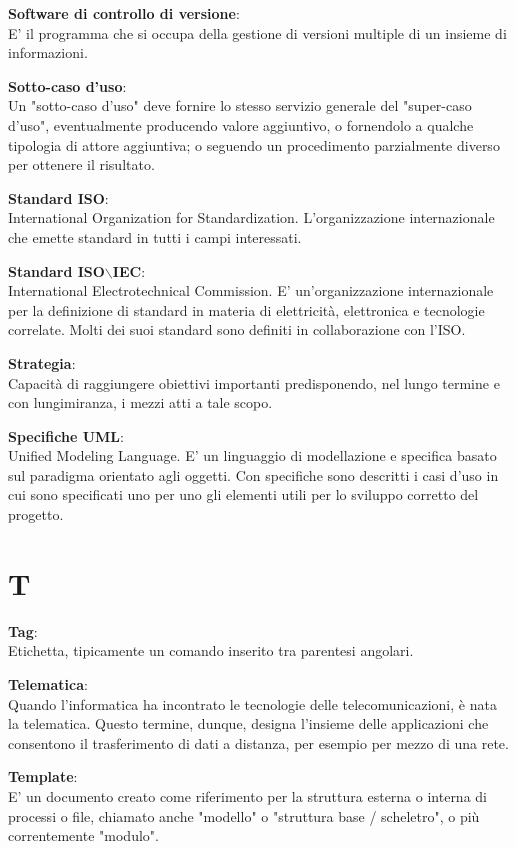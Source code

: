 \documentclass[a4paper, oneside, openany, dvipsnames, table]{article}
\begin{document}
\textbf{Software di controllo di versione}:\\ E' il programma che si occupa della  gestione di versioni multiple di un insieme di informazioni.

\textbf{Sotto-caso d'uso}:\\
Un "sotto-caso d'uso" deve fornire lo stesso servizio generale del "super-caso d'uso", eventualmente producendo valore aggiuntivo, o fornendolo a qualche tipologia di attore aggiuntiva; o seguendo un procedimento parzialmente diverso per ottenere il risultato.

\textbf{Standard ISO}:\\	International Organization for Standardization. L'organizzazione internazionale che emette standard in tutti i campi interessati.

\textbf{Standard ISO$\backslash$IEC}:\\	International Electrotechnical Commission. E' un'organizzazione internazionale per la definizione di standard in materia di elettricità, elettronica e tecnologie correlate. Molti dei suoi standard sono definiti in collaborazione con l'ISO.

\textbf{Strategia}:\\	Capacità di raggiungere obiettivi importanti predisponendo, nel lungo termine e con lungimiranza, i mezzi atti a tale scopo.

\textbf{Specifiche UML}:\\	Unified Modeling Language. E' un linguaggio di modellazione e specifica basato sul paradigma orientato agli oggetti. Con specifiche  sono descritti i casi d'uso in cui sono specificati uno per uno gli elementi utili per lo sviluppo corretto del progetto.


\newpage
\section{T}
\textbf{Tag}:\\		Etichetta, tipicamente un comando inserito tra parentesi angolari.

\textbf{Telematica}:\\	 Quando l'informatica ha incontrato le tecnologie delle telecomunicazioni, è nata la telematica. Questo termine, dunque, designa l'insieme delle applicazioni che consentono il trasferimento di dati a distanza, per esempio per mezzo di una rete. 

\textbf{Template}:\\ E' un documento creato come riferimento per la struttura esterna o interna di processi o file, chiamato anche "modello" o "struttura base / scheletro", o più correntemente "modulo".
\end{document}
